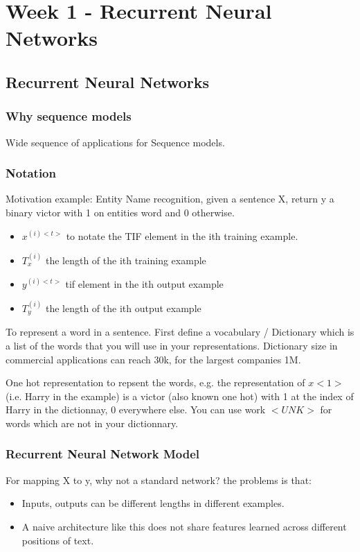 \section{Week 1 - Recurrent Neural Networks}
\subsection{Recurrent Neural Networks}
\subsubsection{Why sequence models}
Wide sequence of applications for Sequence models.

\subsubsection{Notation}
Motivation example:
Entity Name recognition, given a sentence X, return y a binary victor with 1 on entities word and 0 otherwise.

\begin{itemize}
    \item $x^{(i)<t>}$ to notate the TIF element in the ith training example.
    \item $T^{(i)}_x$ the length of the ith training example
    \item $y^{(i)<t>}$ tif element in the ith output example
    \item $T^{(i)}_y$ the length of the ith output example
\end{itemize}
To represent a word in a sentence. First define a vocabulary / Dictionary which is a list of the words that you will use in your representations.
Dictionary size in commercial applications can reach 30k, for the largest companies 1M.

One hot representation to repsent the words, e.g. the representation of $x<1>$ (i.e. Harry in the example) is a victor (also known one hot) with 1 at the index of Harry in the dictionnay, 0 everywhere else. You can use work $<UNK>$ for words which are not in your dictionnary.

\subsubsection{Recurrent Neural Network Model}
For mapping X to y, why not a standard network? the problems is that:

\begin{itemize}
    \item Inputs, outputs can be different lengths in different examples.
    \item A naive architecture like this does not share features learned across different positions of text. 
\end{itemize}

